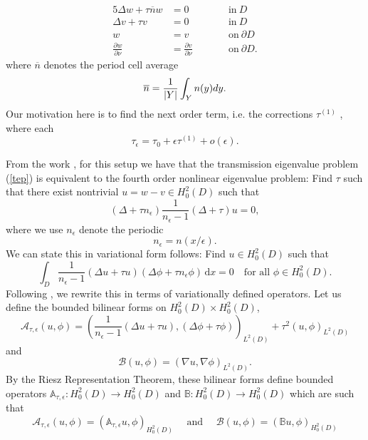 \documentclass[12pt]{article}
\begin{document}
\begin{alignat}{5}\label{tep0}
\Delta w+\tau \overline{n} w &= 0 &\qquad & \mathrm{in} \ D \\
\Delta v+\tau v& =0 & &  \mathrm{in}\  D \\
w&= v  & &\mathrm{on} \ \partial D \\
\displaystyle \frac{\partial w}{\partial \nu}&=\displaystyle \frac{\partial v}{\partial \nu} & & \mathrm{on}\  \partial D.\label{tep10} 
\end{alignat}
where  $\overline{n}$ denotes the period cell average 
$$ \overline{n} = {1\over{|Y|}} \int_Y n(y) dy .$$
Our motivation here is to find the next order term, i.e. the corrections $\tau^{(1)}$ , where each $$ \tau_\epsilon = \tau_0 +\epsilon \tau^{(1)} + o(\epsilon).$$ 

\noindent
From the work \cite{CaGiHa}, for this setup we have that the transmission eigenvalue problem (\ref{tep}) is equivalent to the fourth order nonlinear eigenvalue problem: Find $\tau$ such that there exist  nontrivial  $u=w-v\in H^2_0(D)$  such that 
\begin{equation}\label{10}
(\Delta +  \tau n_\epsilon) \frac{1}{n_\epsilon -1}(\Delta + \tau) u = 0,
\end{equation}
where we use $n_\epsilon$ denote the periodic $$n_\epsilon = n(x/\epsilon).$$
We can state this in variational form follows: Find $u\in H^2_0(D)$ such that
\begin{equation}\label{var}
\int_D \frac{1}{n_\epsilon -1}(\Delta u + \tau u)(\Delta \phi +\tau  n_\epsilon \phi )\, \mathrm{d}x = 0 \quad \text{for all $\phi\in H^2_0(D)$.}
\end{equation}
Following \cite{CaGiHa}, we rewrite this in terms of variationally defined operators. Let  us  define the bounded bilinear forms on $H^2_0(D)\times H^2_0(D)$,
\begin{equation} \label{AA}
\mathcal{A}_{\tau,\epsilon}(u,\phi)= \left ( 
\frac{1}{n_\epsilon-1}(\Delta u + \tau u), (\Delta \phi + \tau \phi)
\right )_{L^2(D)} + \tau^2 (u,\phi)_{L^2(D)}
\end{equation} and 
\begin{equation}
\mathcal{B}(u,\phi) = (\nabla u, \nabla \phi)_{L^2(D)}.
\end{equation}
By the Riesz Representation Theorem, these bilinear forms define bounded operators $\mathbb{A}_{\tau,\epsilon}: H^2_0(D)\rightarrow H^2_0(D)$ and $\mathbb{B}: H^2_0(D)\rightarrow H^2_0(D) $ which are such that 
\begin{equation}\label{Adef}
\mathcal{A}_{\tau,\epsilon}(u,\phi)=(\mathbb{A}_{\tau,\epsilon}u,\phi)_{H^2_0(D)}\quad
 \text{ and }\quad 
\mathcal{B}(u,\phi)=(\mathbb{B} u,\phi)_{H^2_0(D)}
\end{equation}
\end{document}
